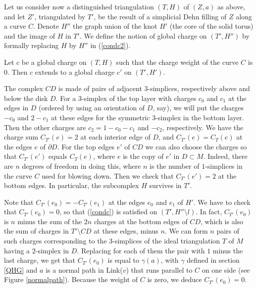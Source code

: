 Let us consider now a distinguished triangulation $(T,H)$ of $(Z,a)$
as above, and let $Z'$, triangulated by $T'$, be the result of a
simplicial Dehn filling of $Z$ along a curve $C$. Denote $H''$ the graph
union of the knot $H'$ (the core of the solid torus) and the image of
$H$ in $T'$. We define the notion of global charge on $(T',H'')$
by formally replacing $H$ by $H''$ in (\ref{condc2}).

\begin{lem}\label{extc} Let $c$ be a global charge on $(T,H)$
such that the charge weight of the curve $C$ is $0$. Then $c$ extends
to a global charge $c'$ on $(T',H')$.
\end{lem}
 The complex $CD$ is made of pairs of
adjacent $3$-simplices, respectively above and below the disk $D$.
For a $3$-simplex of the top layer with charges $c_0$ and $c_1$ at
the edges in $D$ (ordered by using an orientation of $D$, say), we
will put the charges $-c_0$ and $2-c_1$ at these edges for the
symmetric $3$-simplex in the bottom layer. Then the other charges
are $c_2=1-c_0-c_1$ and $-c_2$, respectively. We have the charge
sum $C_{T'}(e)=2$ at each interior edge of $D$, and $C_{T'}(e) =
C_{T}(e)$ at the edges $e$ of $\partial D$. For the top edges $e'$
of $CD$ we can also choose the charges so that $C_{T'}(e')$ equals
$C_T(e)$, where $e$ is the copy of $e'$ in $D \subset M$. Indeed,
there are $n$ degrees of freedom in doing this, where $n$ is the
number of $1$-simplices in the curve $C$ used for blowing down. Then
we check that $C_{T'}(e')=2$ at the bottom edges. In particular,
the subcomplex $H$ survives in $T'$.

Note that $C_{T'}(e_0)=-C_{T'}(e_1)$ at the edges $e_0$ and $e_1$
of $H'$. We have to check that $C_{T'}(e_0)=0$, so that
(\ref{condc}) is satisfied on $(T',H''\setminus l)$. In fact,
$C_{T'}(e_0)$ is $n$ minus the sum of the $2n$ charges at the
bottom edges of $CD$, which is also the sum of charges in
$T'\setminus CD$ at these edges, minus $n$. We can form $n$ pairs
of such charges corresponding to the $3$-simplices of the ideal
triangulation $T$ of $M$ having a $2$-simplex in $D$. Replacing
for each of them the pair with $1$ minus the last charge, we get
that $C_{T'}(e_0)$ is equal to $\gamma(a)$, with $\gamma$ defined
in section \ref{QHG} and $a$ is a normal path in Link($v$) that
runs parallel to $C$ on one side (see Figure \ref{normalpath}).
Because the weight of $C$ is zero, we deduce $C_{T'}(e_0)=0$.

